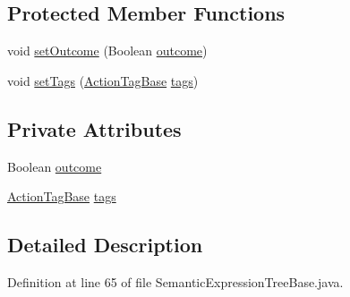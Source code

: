 \subsection*{Protected Member Functions}
\begin{DoxyCompactItemize}
\item 
void \hyperlink{classit_1_1emarolab_1_1cagg_1_1core_1_1evaluation_1_1semanticGrammar_1_1syntaxCompiler_1_1Semant5d395032261986aec1b33357dd21b6bb_a8a980463eeb24d61fa0533d4440f5edd}{set\-Outcome} (Boolean \hyperlink{classit_1_1emarolab_1_1cagg_1_1core_1_1evaluation_1_1semanticGrammar_1_1syntaxCompiler_1_1Semant5d395032261986aec1b33357dd21b6bb_a003ca6665aea086a84e732528f210272}{outcome})
\item 
void \hyperlink{classit_1_1emarolab_1_1cagg_1_1core_1_1evaluation_1_1semanticGrammar_1_1syntaxCompiler_1_1Semant5d395032261986aec1b33357dd21b6bb_a0ca93e7b59acaa85d22672bd68aa79b1}{set\-Tags} (\hyperlink{classit_1_1emarolab_1_1cagg_1_1core_1_1evaluation_1_1semanticGrammar_1_1syntaxCompiler_1_1ActionTagBase}{Action\-Tag\-Base} \hyperlink{classit_1_1emarolab_1_1cagg_1_1core_1_1evaluation_1_1semanticGrammar_1_1syntaxCompiler_1_1Semant5d395032261986aec1b33357dd21b6bb_ac6d9e2acfcce1dded907f7051fecf5a2}{tags})
\end{DoxyCompactItemize}
\subsection*{Private Attributes}
\begin{DoxyCompactItemize}
\item 
Boolean \hyperlink{classit_1_1emarolab_1_1cagg_1_1core_1_1evaluation_1_1semanticGrammar_1_1syntaxCompiler_1_1Semant5d395032261986aec1b33357dd21b6bb_a003ca6665aea086a84e732528f210272}{outcome}
\item 
\hyperlink{classit_1_1emarolab_1_1cagg_1_1core_1_1evaluation_1_1semanticGrammar_1_1syntaxCompiler_1_1ActionTagBase}{Action\-Tag\-Base} \hyperlink{classit_1_1emarolab_1_1cagg_1_1core_1_1evaluation_1_1semanticGrammar_1_1syntaxCompiler_1_1Semant5d395032261986aec1b33357dd21b6bb_ac6d9e2acfcce1dded907f7051fecf5a2}{tags}
\end{DoxyCompactItemize}


\subsection{Detailed Description}


Definition at line 65 of file Semantic\-Expression\-Tree\-Base.\-java.



